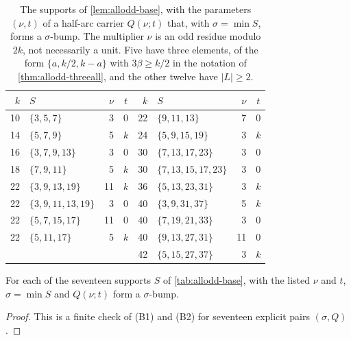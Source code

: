 \begin{table}
\centering
\small
\begin{tabular}{rlrc@{\qquad}rlrc}
$k$ & $S$ & $\nu$ & $t$ & $k$ & $S$ & $\nu$ & $t$\\\hline
10 & $\{3,5,7\}$ & 3 & $0$ & 22 & $\{9,11,13\}$ & 7 & $0$\\
14 & $\{5,7,9\}$ & 5 & $k$ & 24 & $\{5,9,15,19\}$ & 3 & $k$\\
16 & $\{3,7,9,13\}$ & 3 & $0$ & 30 & $\{7,13,17,23\}$ & 3 & $0$\\
18 & $\{7,9,11\}$ & 5 & $k$ & 30 & $\{7,13,15,17,23\}$ & 3 & $0$\\
22 & $\{3,9,13,19\}$ & 11 & $k$ & 36 & $\{5,13,23,31\}$ & 3 & $k$\\
22 & $\{3,9,11,13,19\}$ & 3 & $0$ & 40 & $\{3,9,31,37\}$ & 5 & $k$\\
22 & $\{5,7,15,17\}$ & 11 & $0$ & 40 & $\{7,19,21,33\}$ & 3 & $0$\\
22 & $\{5,11,17\}$ & 5 & $k$ & 40 & $\{9,13,27,31\}$ & 11 & $0$\\
 & & & & 42 & $\{5,15,27,37\}$ & 3 & $k$
\end{tabular}
\caption{The supports of \autoref{lem:allodd-base}, with the parameters
$(\nu,t)$ of a half-arc carrier $Q(\nu;t)$ that, with $\sigma=\min S$, forms a
$\sigma$-bump. The multiplier $\nu$ is an odd residue modulo $2k$, not
necessarily a unit. Five have three elements, of the form $\{a,k/2,k-a\}$ with
$3\beta\ge k/2$ in the notation of \autoref{thm:allodd-threeall}, and the
other twelve have $|L|\ge2$.}
\label{tab:allodd-base}
\end{table}

\begin{lemma}
\label{lem:allodd-base}
For each of the seventeen supports $S$ of \autoref{tab:allodd-base}, with the
listed $\nu$ and $t$, $\sigma=\min S$ and $Q(\nu;t)$ form a $\sigma$-bump.
\end{lemma}

\begin{proof}
This is a finite check of (B1) and (B2) for seventeen explicit pairs
$(\sigma,Q)$.
\end{proof}


